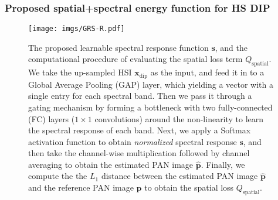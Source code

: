\documentclass[journal]{IEEEtran}
\begin{document}
\subsubsection{Proposed spatial+spectral energy function for HS DIP}
    \label{proposed_dip}
    \begin{figure}[tb!]
        \centering
        \texttt{[image: imgs/GRS-R.pdf]}
        \caption{The proposed learnable spectral response function $\mathbf{s}$, and the computational procedure of evaluating the spatial loss term $Q_{\text{spatial}}$. We take the up-sampled HSI $\mathbf{x}_{\text{dip}}$ as the input, and feed it in to a Global Average Pooling (GAP) layer, which yielding a vector with a single entry for each spectral band. Then we pass it through a gating mechanism  by  forming  a  bottleneck  with  two  fully-connected (FC) layers ($1 \times 1$ convolutions) around the non-linearity to learn the spectral response of each band. Next, we apply a Softmax activation function to obtain \textit{normalized} spectral response $\mathbf{s}$, and then take the channel-wise multiplication followed by channel averaging to obtain the estimated PAN image $\hat{\mathbf{p}}$. Finally, we compute the the $L_1$ distance between the estimated PAN image $\hat{\mathbf{p}}$ and the reference PAN image $\mathbf{p}$ to obtain the spatial loss $Q_{\text{spatial}}$.}
        \label{fig:compute_spatial_loss}
    \end{figure}
    
\end{document}
